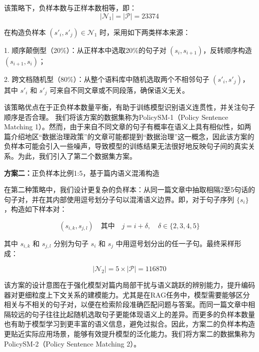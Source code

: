 \documentclass[12pt, a4paper]{ctexart}
\begin{document}
该策略下，负样本数与正样本数相等，即：
\begin{equation}
|\mathcal{N}_1| = |\mathcal{P}| = 23374
\end{equation}

在构造负样本 $(s'_i, s'_j) \in \mathcal{N}_1$ 时，采用如下两类样本来源：

1. 顺序颠倒型（20\%）：从正样本中选取20\%的句子对 $(s_i, s_{i+1})$，反转顺序构造 $(s_{i+1}, s_i)$；

2. 跨文档随机型（80\%）：从整个语料库中随机选取两个不相邻句子 $(s'_i, s'_j)$，其中 $s'_i$ 和 $s'_j$ 可来自不同文章或不同段落，确保语义无关。

该策略优点在于正负样本数量平衡，有助于训练模型识别语义连贯性，并关注句子顺序是否合理。
我们将该方案的数据集称为PolicySM-1（Policy Sentence Matching 1）。然而，由于来自不同文章的句子有概率在语义上具有相似性，如两篇介绍地区“数据治理政策”的文章可能都提到“数据治理”这一概念，因此该方案的负样本可能会引入一些噪声，导致模型的训练结果无法很好地反映句子间的真实关系。为此，我们引入了第二个数据集方案。

\vspace{2em} %

\textbf{方案二：}正负样本比例1:5，基于篇内语义混淆构造

在第二种策略中，我们设计更复杂的负样本：从同一篇文章中抽取相隔2至5句话的句子对，并在其内部使用逗号划分子句以混淆语义边界。即，对于句子序列 $\{s_i\}$，构造如下样本对：

\begin{equation}
(s_{i,k}, s_{j,l}) \quad \text{其中} \quad j = i + \delta,\quad \delta \in \{2, 3, 4, 5\}
\end{equation}

其中 $s_{i,k}$ 和 $s_{j,l}$ 分别为句子 $s_i$ 和 $s_j$ 中用逗号划分出的任一子句。最终采样形成：

\begin{equation}
|\mathcal{N}_2| = 5 \times |\mathcal{P}| = 116870
\end{equation}

该方案的设计意图在于强化模型对篇内局部干扰与语义跳跃的辨别能力，提升编码器对更细粒度上下文关系的建模能力。尤其是在RAG任务中，模型需要能够区分相关与不相关的句子对，以便在检索阶段准确匹配问题与答案。而同一篇文章中相隔较远的句子往往比起随机选取句子更能体现语义上的差异。而更多的负样本数量也有助于模型学习到更丰富的语义信息，避免过拟合。因此，方案二的负样本构造更贴近实际应用场景，能够有效提升模型的泛化能力。我们将方案二的数据集称为PolicySM-2（Policy Sentence Matching 2）。
\end{document}
